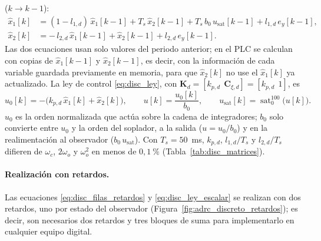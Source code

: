 ($k \to k-1$):
\begin{equation}
\begin{aligned}
\hat{x}_1[k] &= (1 - l_{1,d})\,\hat{x}_1[k-1] + T_s\,\hat{x}_2[k-1] + T_s\,b_0\,u_{\mathrm{sat}}[k-1] + l_{1,d}\,e_y[k-1], \\[2pt]
\hat{x}_2[k] &= -\,l_{2,d}\,\hat{x}_1[k-1] + \hat{x}_2[k-1] + l_{2,d}\,e_y[k-1] .
\end{aligned}
\label{eq:disc_filas_retardos}
\end{equation}
Las dos ecuaciones usan solo valores del periodo anterior; en el PLC se
calculan con copias de $\hat{x}_1[k-1]$ y $\hat{x}_2[k-1]$, es decir, con la información de cada
variable guardada previamente en memoria, para que
$\hat{x}_2[k]$ no use el $\hat{x}_1[k]$ ya actualizado.
La ley de control \eqref{eq:disc_ley}, con $\mathbf{K}_d = [k_{p,d}\ \ \mathbf{C}_{\xi,d}] = [k_{p,d}\ \ 1]$, es
\begin{equation}
u_0[k] = -\bigl(k_{p,d}\,\hat{x}_1[k] + \hat{x}_2[k]\bigr),
\qquad
u[k] = \frac{u_0[k]}{b_0},
\qquad
u_{\mathrm{sat}}[k] = \operatorname{sat}_{0}^{100}\bigl(u[k]\bigr) .
\label{eq:disc_ley_escalar}
\end{equation}
$u_0$ es la orden normalizada que actúa sobre la cadena de integradores; $b_0$
solo convierte entre $u_0$ y la orden del soplador, a la salida
($u = u_0/b_0$) y en la realimentación al observador ($b_0\,u_{\mathrm{sat}}$).
Con $T_s = 50$~ms, $k_{p,d}$, $l_{1,d}/T_s$ y $l_{2,d}/T_s$ difieren de
$\omega_c$, $2\omega_o$ y $\omega_o^2$ en menos de $0{,}1~\%$
(Tabla~\ref{tab:disc_matrices}).
\paragraph{Realización con retardos.} Las ecuaciones \eqref{eq:disc_filas_retardos}
y \eqref{eq:disc_ley_escalar} se realizan con dos retardos, uno por estado del
observador (Figura~\ref{fig:adrc_discreto_retardos}); es decir, son necesarios dos retardos y
tres bloques de suma para implementarlo en cualquier equipo digital.

